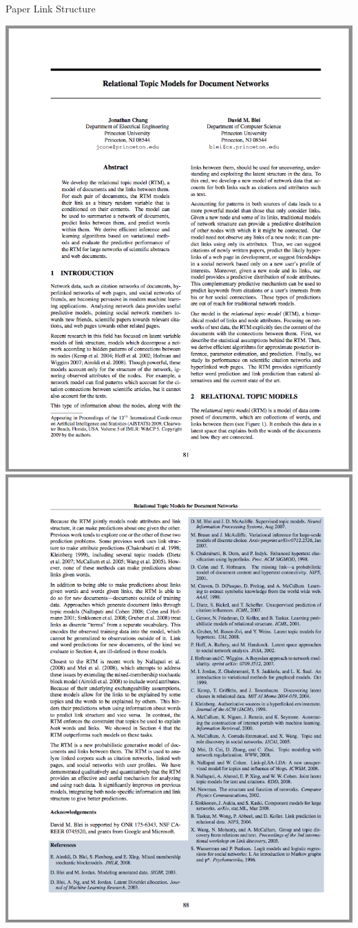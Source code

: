 \documentclass[xcolor=dvipsnames]{beamer}
\begin{document}
\begin{frame}{Paper Link Structure}

\begin{center}
 {
    \includegraphics[scale=0.2]{rtm-frontpage.png}
    \includegraphics[scale=0.2]{rtm-citations.png}  }

\end{center}
\end{frame}
\end{document}
